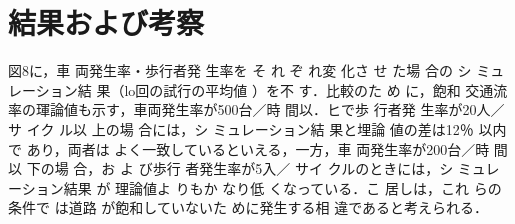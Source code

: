 \section{結果および考察}

図8に，車 両発生率・歩行者発 生率を そ れ ぞ れ変 化さ せ た場 合の シ ミュレーション結 果（lo回の試行の平均値 ）を不 す．比較のた め に，飽和 交通流率の琿論値も示す，車両発生率が500台／時 間以．ヒで歩 行者発 生率が20人／サ イク ル以 上の場 合には，シ ミュレーション結 果と埋論 値の差は12％ 以内で あり，両者は よく一致しているといえる，一方，車 両発生率が200台／時 間以 下の場 合，お よ び歩行 者発生率が5入／ サイ クルのときには，シ ミュレーション結果 が 理論値よ りもか なり低 くなっている．こ 居しは，これ らの条件で は道路 が飽和していないた めに発生する相 違であると考えられる．
